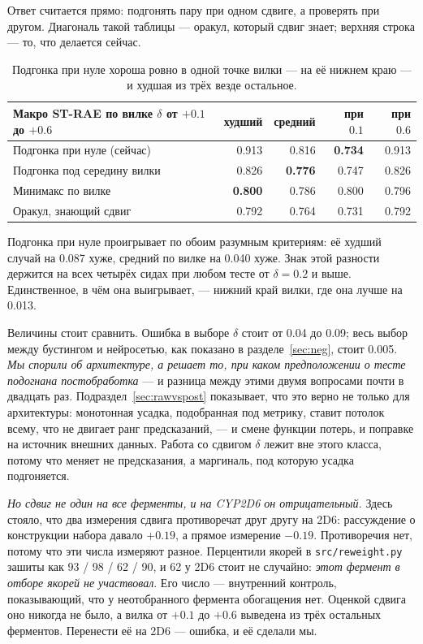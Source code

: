 Ответ считается прямо: подгонять пару при одном сдвиге, а проверять при другом. Диагональ
такой таблицы --- оракул, который сдвиг знает; верхняя строка --- то, что делается сейчас.

\begin{table}[htbp]\centering\small
\begin{tabularx}{\textwidth}{@{}Xrrrr@{}}
\toprule
Макро ST-RAE по вилке $\delta$ от $+0.1$ до $+0.6$ & худший & средний & при $0.1$ & при $0.6$ \\
\midrule
Подгонка при нуле (сейчас)      & 0.913 & 0.816 & \textbf{0.734} & 0.913 \\
Подгонка под середину вилки     & 0.826 & \textbf{0.776} & 0.747 & 0.826 \\
Минимакс по вилке               & \textbf{0.800} & 0.786 & 0.800 & 0.796 \\
\addlinespace[2pt]
Оракул, знающий сдвиг           & 0.792 & 0.764 & 0.731 & 0.792 \\
\bottomrule
\end{tabularx}
\caption{Подгонка при нуле хороша ровно в одной точке вилки --- на её нижнем краю --- и
худшая из трёх везде остальное.}
\label{tab:choosedelta}
\end{table}

Подгонка при нуле проигрывает по обоим разумным критериям: её худший случай на 0.087 хуже,
средний по вилке на 0.040 хуже. Знак этой разности держится на всех четырёх сидах при любом
тесте от $\delta = 0.2$ и выше. Единственное, в чём она выигрывает, --- нижний край вилки,
где она лучше на 0.013.

Величины стоит сравнить. Ошибка в выборе $\delta$ стоит от 0.04 до 0.09; весь выбор между
бустингом и нейросетью, как показано в разделе~\ref{sec:neg}, стоит 0.005. \emph{Мы спорили
об архитектуре, а решает то, при каком предположении о тесте подогнана постобработка} ---
и разница между этими двумя вопросами почти в двадцать раз. Подраздел~\ref{sec:rawvspost}
показывает, что это верно не только для архитектуры: монотонная усадка, подобранная под
метрику, ставит потолок всему, что не двигает ранг предсказаний, --- и смене функции потерь,
и поправке на источник внешних данных. Работа со сдвигом $\delta$ лежит вне этого класса,
потому что меняет не предсказания, а маргиналь, под которую усадка подгоняется.

\emph{Но сдвиг не один на все ферменты, и на CYP2D6 он отрицательный.} Здесь стояло, что два
измерения сдвига противоречат друг другу на 2D6: рассуждение о конструкции набора давало
$+0.19$, а прямое измерение $-0.19$. Противоречия нет, потому что эти числа измеряют разное.
Перцентили якорей в \texttt{src/reweight.py} зашиты как 93 / 98 / 62 / 90, и 62 у 2D6 стоит
не случайно: \emph{этот фермент в отборе якорей не участвовал}. Его число --- внутренний
контроль, показывающий, что у неотобранного фермента обогащения нет. Оценкой сдвига оно
никогда не было, а вилка от $+0.1$ до $+0.6$ выведена из трёх остальных ферментов. Перенести
её на 2D6 --- ошибка, и её сделали мы.


